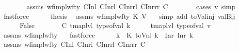 \begin{isabellebody}
\ \ \ \ \ \ \isamarkupfalse%
\ assms\ wf{\isacharunderscore}{\kern0pt}impl{\isacharunderscore}{\kern0pt}wf{\isacharunderscore}{\kern0pt}ty\ C{}Inl\ C{}Inrl\ C{}Inrrl\ C{}Inrrr\ C\isanewline
\ \ \ \ \ \ \isamarkupfalse%
\ {\isacharparenleft}{\kern0pt}cases\ v{\isacharsemicolon}{\kern0pt}\ simp{\isacharparenright}{\kern0pt}\ \isamarkupfalse%
\ fastforce\isanewline
\ \ \ \ \isamarkupfalse%
\ {\isacharquery}{\kern0pt}thesis\ \isamarkupfalse%
\ assms\ wf{\isacharunderscore}{\kern0pt}impl{\isacharunderscore}{\kern0pt}wf{\isacharunderscore}{\kern0pt}ty\ K\ V\ {\isachardoublequoteopen}{}{\isachardoublequoteclose}\ \isamarkupfalse%
\ {\isacharparenleft}{\kern0pt}simp\ add{\isacharcolon}{\kern0pt}\ toVal{}{}{}{}{\isacharunderscore}{\kern0pt}inj\ valBij{\isacharparenright}{\kern0pt}\isanewline
\ \ \isamarkupfalse%
\isanewline
\ \ \ \ \isamarkupfalse%
\ False\isanewline
\ \ \ \ \isamarkupfalse%
\ \isamarkupfalse%
\ C{\isacharcolon}{\kern0pt}\ {\isachardoublequoteopen}tmap{\isacharunderscore}{\kern0pt}lvl\ {\isacharparenleft}{\kern0pt}type{\isacharunderscore}{\kern0pt}of{\isacharunderscore}{\kern0pt}val\ k{\isacharparenright}{\kern0pt}\ {\isasymle}\ {}\ \ {\isasymand}\ \ tmap{\isacharunderscore}{\kern0pt}lvl\ {\isacharparenleft}{\kern0pt}type{\isacharunderscore}{\kern0pt}of{\isacharunderscore}{\kern0pt}val\ v{\isacharparenright}{\kern0pt}\ {\isacharequal}{\kern0pt}\ {}{\isachardoublequoteclose}\isanewline
\ \ \ \ \ \ \isamarkupfalse%
\ assms\ wf{\isacharunderscore}{\kern0pt}impl{\isacharunderscore}{\kern0pt}wf{\isacharunderscore}{\kern0pt}ty\ {\isachardoublequoteopen}{}{\isachardoublequoteclose}\ \isamarkupfalse%
\ fastforce\isanewline
\ \ \ \ \isamarkupfalse%
\ k{\isacharprime}{\kern0pt}\ \ K{\isacharcolon}{\kern0pt}\ {\isachardoublequoteopen}toVal{}{}{}{}\ k\ {\isacharequal}{\kern0pt}\ Inr\ {\isacharparenleft}{\kern0pt}Inr\ k{\isacharprime}{\kern0pt}{\isacharparenright}{\kern0pt}{\isachardoublequoteclose}\isanewline
\ \ \ \ \ \ \isamarkupfalse%
\ assms\ wf{\isacharunderscore}{\kern0pt}impl{\isacharunderscore}{\kern0pt}wf{\isacharunderscore}{\kern0pt}ty\ C{}Inl\ C{}Inrl\ C{}Inrrl\ C{}Inrrr\ C\isanewline

\end{isabellebody}
